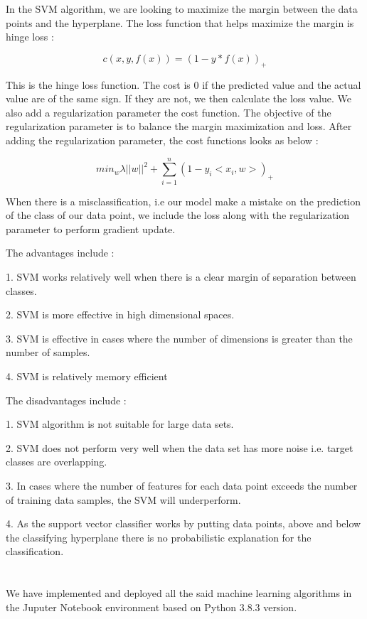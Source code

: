 \documentclass[12pt]{article}
\newcommand{\mainsize}{\fontsize{16pt}{12pt}\selectfont}
\begin{document}
In the SVM algorithm, we are looking to maximize the margin between the data points and the hyperplane. The loss function that helps maximize the margin is hinge loss : 

\begin{equation*}
c(x,y,f(x))=(1-y*f(x))_{+}
\end{equation*}

This is the hinge loss function. The cost is 0 if the predicted value and the actual value are of the same sign. If they are not, we then calculate the loss value. We also add a regularization parameter the cost function. The objective of the regularization parameter is to balance the margin maximization and loss. After adding the regularization parameter, the cost functions looks as below :

\begin{equation*} 
min_{w} \lambda ||w||^{2} + \sum_{i=1}^{n}{(1-y_i <x_i,w>)_+}
\end{equation*}

When there is a misclassification, i.e our model make a mistake on the prediction of the class of our data point, we include the loss along with the regularization parameter to perform gradient update.

The advantages include : 

1. SVM works relatively well when there is a clear margin of separation between classes.

2. SVM is more effective in high dimensional spaces.

3. SVM is effective in cases where the number of dimensions is greater than the number of samples.


4. SVM is relatively memory efficient

The disadvantages include : 

1. SVM algorithm is not suitable for large data sets.

2. SVM does not perform very well when the data set has more noise i.e. target classes are overlapping.

3. In cases where the number of features for each data point exceeds the number of training data samples, the SVM will underperform.

4. As the support vector classifier works by putting data points, above and below the classifying hyperplane there is no probabilistic explanation for the classification.
\newpage
\section{\mainsize{\textbf{IMPLEMENTATION}}}
We have implemented and deployed all the said machine learning algorithms in the Juputer Notebook environment based on Python 3.8.3 version. 
\end{document}
